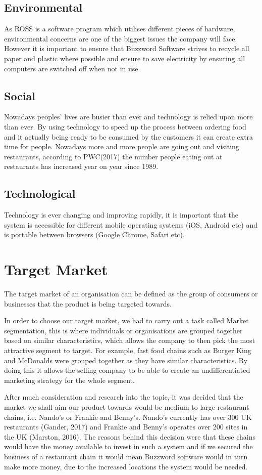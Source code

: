 \documentclass[11pt, oneside, a4paper]{report}   %
\begin{document}
\begin{flushleft}
\subsection{Environmental}
As ROSS is a software program which utilises different pieces of hardware, environmental concerns are one of the biggest issues the company will face. However it is important to ensure that Buzzword Software strives to recycle all paper and plastic where possible and ensure to save electricity by ensuring all computers are switched off when not in use. 
\subsection{Social}
Nowadays peoples’ lives are busier than ever and technology is relied upon more than ever. By using technology to speed up the process between ordering food and it actually being ready to be consumed by the customers it can create extra time for people. Nowadays more and more people are going out and visiting restaurants, according to PWC(2017) the number people eating out at restaurants has increased year on year since 1989. 
\subsection{Technological}
Technology is ever changing and improving rapidly, it is important that the system is accessible for different mobile operating systems (iOS, Android etc) and is portable between browsers (Google Chrome, Safari etc). 

\newpage
\section{Target Market}
The target market of an organisation can be defined as the group of consumers or businesses that the product is being targeted towards. 

In order to choose our target market, we had to carry out a task called Market segmentation, this is where individuals or organisations are grouped together based on similar characteristics, which allows the company to then pick the most attractive segment to target. For example, fast food chains such as Burger King and McDonalds were grouped together as they have similar characteristics. By doing this it allows the selling company to be able to create an undifferentiated marketing strategy for the whole segment. 

After much consideration and research into the topic, it was decided that the market we shall aim our product towards would be medium to large restaurant chains, i.e. Nando’s or Frankie and Benny’s. Nando’s currently has over 300 UK restaurants (Gander, 2017) and Frankie and Benny’s operates over 200 sites in the UK (Marston, 2016). The reasons behind this decision were that these chains would have the money available to invest in such a system and if we secured the business of a restaurant chain it would mean Buzzword software would in turn make more money, due to the increased locations the system would be needed. 


\end{flushleft}
\end{document}
